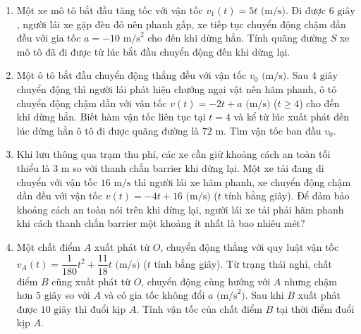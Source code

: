 \documentclass[12pt]{article}
\begin{document}
	\begin{btvang}
		\begin{enumerate}[label=\textbf{Bài \arabic*.}]
			\item Một xe mô tô bắt đầu tăng tốc với vận tốc $v_1(t) = 5t\text{ (m/s)}$. Đi được $6\text{ giây}$, người lái xe gặp đèn đỏ nên phanh gấp, xe tiếp tục chuyển động chậm dần đều với gia tốc $a = -10\text{ m/s}^2$ cho đến khi dừng hẳn. Tính quãng đường $S$ xe mô tô đã đi được từ lúc bắt đầu chuyển động đến khi dừng lại.
			\item Một ô tô bắt đầu chuyển động thẳng đều với vận tốc $v_0\text{ (m/s)}$. Sau $4\text{ giây}$ chuyển động thì người lái phát hiện chướng ngại vật nên hãm phanh, ô tô chuyển động chậm dần với vận tốc $v(t) = -2t + a\text{ (m/s)}$ ($t \ge 4$) cho đến khi dừng hẳn. Biết hàm vận tốc liên tục tại $t = 4$ và kể từ lúc xuất phát đến lúc dừng hẳn ô tô đi được quãng đường là $72\text{ m}$. Tìm vận tốc ban đầu $v_0$.
			\item Khi lưu thông qua trạm thu phí, các xe cần giữ khoảng cách an toàn tối thiểu là $3\text{ m}$ so với thanh chắn barrier khi dừng lại. Một xe tải đang di chuyển với vận tốc $16\text{ m/s}$ thì người lái xe hãm phanh, xe chuyển động chậm dần đều với vận tốc $v(t) = -4t + 16\text{ (m/s)}$ ($t$ tính bằng giây). Để đảm bảo khoảng cách an toàn nói trên khi dừng lại, người lái xe tải phải hãm phanh khi cách thanh chắn barrier một khoảng ít nhất là bao nhiêu mét?
			\item Một chất điểm $A$ xuất phát từ $O$, chuyển động thẳng với quy luật vận tốc $v_A(t) = \dfrac{1}{180}t^2 + \dfrac{11}{18}t\text{ (m/s)}$ ($t$ tính bằng giây). Từ trạng thái nghỉ, chất điểm $B$ cũng xuất phát từ $O$, chuyển động cùng hướng với $A$ nhưng chậm hơn $5\text{ giây}$ so với $A$ và có gia tốc không đổi $a\text{ (m/s}^2\text{)}$. Sau khi $B$ xuất phát được $10\text{ giây}$ thì đuổi kịp $A$. Tính vận tốc của chất điểm $B$ tại thời điểm đuổi kịp $A$.
		\end{enumerate}
	\end{btvang}
	
\end{document}
